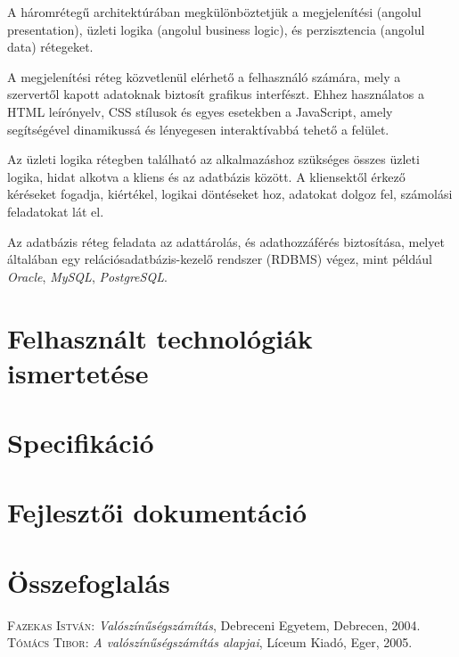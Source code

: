 \documentclass[
]{thesis-ekf}
\theoremstyle{definition}
\theoremstyle{remark}
\newtheorem{megjegyzes}[tetel]{Megjegyzés}
\begin{document}
A háromrétegű architektúrában megkülönböztetjük a megjelenítési (angolul presentation), üzleti logika (angolul business logic), és perzisztencia (angolul data) rétegeket.

A megjelenítési réteg közvetlenül elérhető a felhasználó számára, mely a szervertől kapott adatoknak biztosít grafikus interfészt. Ehhez használatos a HTML leírónyelv, CSS stílusok és egyes esetekben a JavaScript, amely segítségével dinamikussá és lényegesen interaktívabbá tehető a felület.

Az üzleti logika rétegben található az alkalmazáshoz szükséges összes üzleti logika, hidat alkotva a kliens és az adatbázis között. A kliensektől érkező kéréseket fogadja, kiértékel, logikai döntéseket hoz, adatokat dolgoz fel, számolási feladatokat lát el.

Az adatbázis réteg feladata az adattárolás, és adathozzáférés biztosítása, melyet általában egy relációsadatbázis-kezelő rendszer (RDBMS) végez, mint például \emph{Oracle}, \emph{MySQL}, \emph{PostgreSQL}.
\chapter{Felhasznált technológiák ismertetése}


\chapter{Specifikáció}

\chapter{Fejlesztői dokumentáció}

\chapter{Összefoglalás}

\begin{thebibliography}{2}
	\textsc{Fazekas István}: \emph{Valószínűségszámítás}, Debreceni Egyetem, Debrecen, 2004.
	\textsc{Tómács Tibor}: \emph{A valószínűségszámítás alapjai}, Líceum Kiadó, Eger, 2005.
\end{thebibliography}
\end{document}
